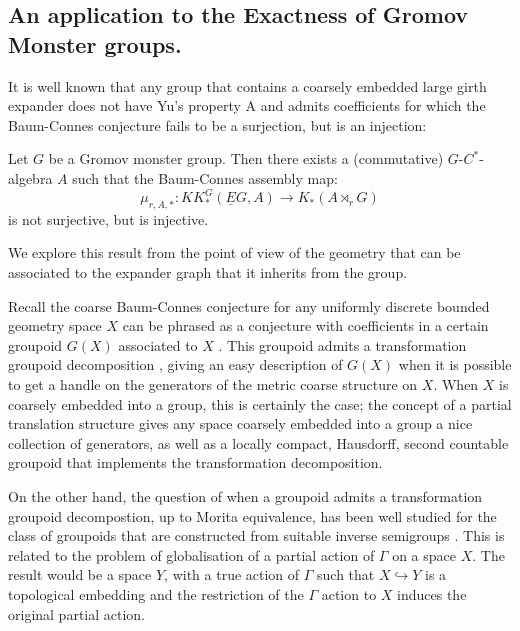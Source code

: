 \begin{example}
\section{An application to the Exactness of Gromov Monster groups.}

It is well known \cite{MR1911663,explg1} that any group that contains a coarsely embedded large girth expander does not have Yu's property A and admits coefficients for which the Baum-Connes conjecture fails to be a surjection, but is an injection:

\begin{theorem}\label{Thm:IT1}
Let $G$ be a Gromov monster group. Then there exists a (commutative) $G$-$C^{*}$-algebra $A$ such that the Baum-Connes assembly map:
\begin{equation*}
\mu_{r,A,*}: KK^{G}_{*}(\underline{E}G, A) \rightarrow K_{*}(A\rtimes_{r}G)
\end{equation*}
is not surjective, but is injective.
\end{theorem}

We explore this result from the point of view of the geometry that can be associated to the expander graph that it inherits from the group.

Recall the coarse Baum-Connes conjecture for any uniformly discrete bounded geometry space $X$ can be phrased as a conjecture with coefficients in a certain groupoid $G(X)$ associated to $X$ \cite{MR1905840}. This groupoid admits a transformation groupoid decomposition \cite[Lemma 3.3b)]{MR1905840}, giving an easy description of $G(X)$ when it is possible to get a handle on the generators of the metric coarse structure on $X$. When $X$ is coarsely embedded into a group, this is certainly the case; the concept of a partial translation structure \cite{MR2363428} gives any space coarsely embedded into a group a nice collection of generators, as well as a locally compact, Hausdorff, second countable \etale groupoid that implements the transformation decomposition.

On the other hand, the question of when a groupoid admits a transformation groupoid decompostion, up to Morita equivalence, has been well studied for the class of groupoids that are constructed from suitable inverse semigroups \cite{MR1900993,Milan-Steinberg}. This is related to the problem of globalisation of a partial action of $\Gamma$ on a space $X$. The result would be a space $Y$, with a true action of $\Gamma$ such that $X \hookrightarrow Y$ is a topological embedding and the restriction of the $\Gamma$ action to $X$ induces the original partial action.


\end{example}

